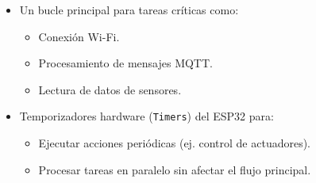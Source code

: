 \begin{itemize}
    \item Un bucle principal para tareas críticas como:
          \begin{itemize}
              \item Conexión Wi-Fi.
              \item Procesamiento de mensajes MQTT.
              \item Lectura de datos de sensores.
          \end{itemize}
    \item Temporizadores hardware (\texttt{Timers}) del ESP32 para:
          \begin{itemize}
              \item Ejecutar acciones periódicas (ej. control de actuadores).
              \item Procesar tareas en paralelo sin afectar el flujo principal.
          \end{itemize}
\end{itemize}








